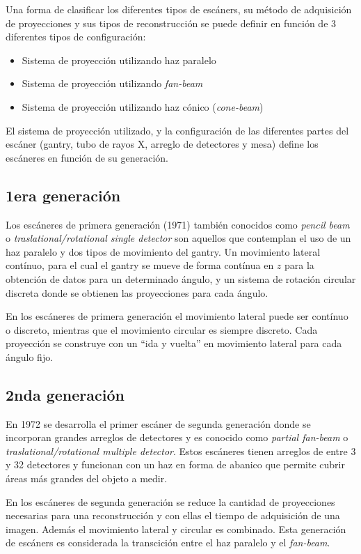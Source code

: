 Una forma de clasificar los diferentes tipos de escáners, su método de adquisición de proyecciones y sus tipos de reconstrucción se puede definir en función de 3 diferentes tipos de configuración:

\begin{itemize}
 \item Sistema de proyección utilizando haz paralelo
 \item Sistema de proyección utilizando \emph{fan-beam}
 \item Sistema de proyección utilizando haz cónico (\emph{cone-beam})
\end{itemize}

El sistema de proyección utilizado, y la configuración de las diferentes partes del escáner (gantry, tubo de rayos X, arreglo de detectores y mesa) define los escáneres en función de su generación.

\subsection{1era generaci\'on}

Los escáneres de primera generación (1971) también conocidos como \emph{pencil beam} o \emph{traslational/rotational single detector} son aquellos que contemplan el uso de un haz paralelo y dos tipos de movimiento del gantry. Un movimiento lateral contínuo, para el cual el gantry se mueve de forma contínua en $z$ para la obtención de datos para un determinado ángulo, y un sistema de rotación circular discreta donde se obtienen las proyecciones para cada ángulo.

En los escáneres de primera generación el movimiento lateral puede ser contínuo o discreto, mientras que el movimiento circular es siempre discreto. Cada proyección se construye con un ``ida y vuelta'' en movimiento lateral para cada ángulo fijo.

\subsection{2nda generaci\'on}

En 1972 se desarrolla el primer escáner de segunda generación donde se incorporan grandes arreglos de detectores y es conocido como \emph{partial fan-beam} o \emph{traslational/rotational multiple detector}. Estos escáneres tienen arreglos de entre 3 y 32 detectores y funcionan con un haz en forma de abanico que permite cubrir áreas más grandes del objeto a medir.

En los escáneres de segunda generación se reduce la cantidad de proyecciones necesarias para una reconstrucción y con ellas el tiempo de adquisición de una imagen. Además el movimiento lateral y circular es combinado. Esta generación de escáners es considerada la transcición entre el haz paralelo y el \emph{fan-beam}.

